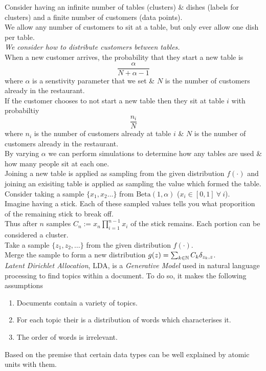 \documentclass[11pt,a4paper]{article}
\begin{document}
Consider having an infinite number of tables (clusters) \& dishes (labels for clusters) and a finite number of customers (data points).\\
We allow any number of customers to sit at a table, but only ever allow one dish per table.\\
\textit{We consider how to distribute customers between tables.}\\
When a new customer arrives, the probability that they start a new table is
$$\frac\alpha{N+\alpha-1}$$
where $\alpha$ is a senstivity parameter that we set \& $N$ is the number of customers already in the restaurant.\\
If the customer chooses to not start a new table then they sit at table $i$ with probabiltiy
$$\frac{n_i}N$$
where $n_i$ is the number of customers already at table $i$ \& $N$ is the number of customers already in the restaurant.\\
By varying $\alpha$ we can perform simulations to determine how any tables are used \& how many people sit at each one.\\
Joining a new table is applied as sampling from the given distribution $f(\cdot)$ and joining an exisiting table is applied as sampling the value which formed the table.\\

Consider taking a sample $\{x_1,x_2\dots\}$ from $\text{Beta}(1,\alpha)$ ($x_i\in[0,1]\ \forall\ i$).\\
Imagine having a stick. Each of these sampled values tells you what proporition of the remaining stick to break off.\\
Thus after $n$ samples $C_n:=x_n\prod_{i=1}^{n-1}x_i$ of the stick remains. Each portion can be considered a cluster.\\
Take a sample $\{z_1,z_2,\dots\}$ from the given distribution $f(\cdot)$.\\
Merge the sample to form a new distribution $g(z)=\sum_{k\in\mathbb{N}}C_k\delta_{z_k,z}$.\\

\textit{Latent Dirichlet Allocation}, LDA, is a \textit{Generative Model} used in natural language processing to find topics within a document. To do so, it makes the following assumptions
\begin{enumerate}
	\item Documents contain a variety of topics.
	\item For each topic their is a distribution of words which characterises it.
	\item The order of words is irrelevant.
\end{enumerate}
\nb Based on the premise that certain data types can be well explained by atomic units with them.\\
\end{document}

